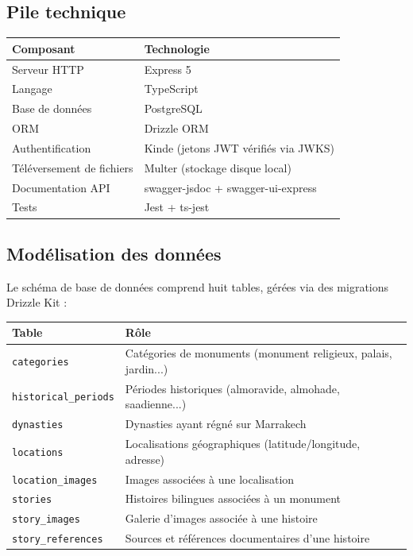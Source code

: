 \documentclass[11pt,a4paper]{article}
\begin{document}
\subsection{Pile technique}

\begin{center}
\begin{tabular}{@{}ll@{}}
\toprule
\textbf{Composant} & \textbf{Technologie} \\
\midrule
Serveur HTTP & Express 5 \\
Langage & TypeScript \\
Base de données & PostgreSQL \\
ORM & Drizzle ORM \\
Authentification & Kinde (jetons JWT vérifiés via JWKS) \\
Téléversement de fichiers & Multer (stockage disque local) \\
Documentation API & swagger-jsdoc + swagger-ui-express \\
Tests & Jest + ts-jest \\
\bottomrule
\end{tabular}
\end{center}

\subsection{Modélisation des données}

Le schéma de base de données comprend huit tables, gérées via des migrations Drizzle Kit :

\begin{center}
\begin{tabular}{@{}ll@{}}
\toprule
\textbf{Table} & \textbf{Rôle} \\
\midrule
\texttt{categories} & Catégories de monuments (monument religieux, palais, jardin...) \\
\texttt{historical\_periods} & Périodes historiques (almoravide, almohade, saadienne...) \\
\texttt{dynasties} & Dynasties ayant régné sur Marrakech \\
\texttt{locations} & Localisations géographiques (latitude/longitude, adresse) \\
\texttt{location\_images} & Images associées à une localisation \\
\texttt{stories} & Histoires bilingues associées à un monument \\
\texttt{story\_images} & Galerie d'images associée à une histoire \\
\texttt{story\_references} & Sources et références documentaires d'une histoire \\
\bottomrule
\end{tabular}
\end{center}
\end{document}
